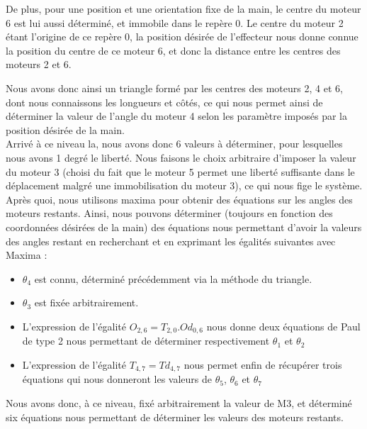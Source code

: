 De plus, pour une position et une orientation fixe de la main, le centre du moteur 6 est lui aussi déterminé, et immobile dans le repère 0. Le centre du moteur 2 étant l'origine de ce repère 0, la position désirée de l'effecteur nous donne connue la position du centre de ce moteur 6, et donc la distance entre les centres des moteurs 2 et 6.
\newpage

Nous avons donc ainsi un triangle formé par les centres des moteurs 2, 4 et 6, dont nous connaissons les longueurs et côtés, ce qui nous permet ainsi de déterminer la valeur de l'angle du moteur 4 selon les paramètre imposés par la position désirée de la main.\\

Arrivé à ce niveau la, nous avons donc 6 valeurs à déterminer, pour lesquelles nous avons 1 degré le liberté. Nous faisons le choix arbitraire d'imposer la valeur du moteur 3 (choisi du fait que le moteur 5 permet une liberté suffisante dans le déplacement malgré une immobilisation du moteur 3), ce qui nous fige le système.\\

Après quoi, nous utilisons maxima pour obtenir des équations sur les angles des moteurs restants. Ainsi, nous pouvons déterminer (toujours en fonction des coordonnées désirées de la main) des équations nous permettant d'avoir la valeurs des angles restant en recherchant et en exprimant les égalités suivantes avec Maxima :\\

\begin{itemize}
\item $\theta_4$ est connu, déterminé précédemment via la méthode du triangle.
\item $\theta_3$ est fixée arbitrairement.
\item L'expression de l'égalité $O_{2, 6} = T_{2, 0} . Od_{0, 6}$ nous donne deux équations de Paul de type 2 nous permettant de déterminer respectivement $\theta_1$ et  $\theta_2$
\item L'expression de l'égalité $T_{4, 7} = Td_{4, 7}$ nous permet enfin de récupérer trois équations qui nous donneront les valeurs de $\theta_5$, $\theta_6$ et $\theta_7$\\

\end{itemize}

Nous avons donc, à ce niveau, fixé arbitrairement la valeur de M3, et déterminé six équations nous permettant de déterminer les valeurs des moteurs restants.

